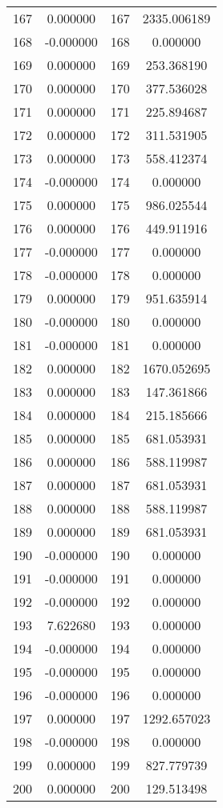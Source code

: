 \documentclass[12pt]{article}
\begin{document}
\begin{longtable}{@{}cccc@{}}
167 & 0.000000 & 167 & 2335.006189 \\
168 & -0.000000 & 168 & 0.000000 \\
169 & 0.000000 & 169 & 253.368190 \\
170 & 0.000000 & 170 & 377.536028 \\
171 & 0.000000 & 171 & 225.894687 \\
172 & 0.000000 & 172 & 311.531905 \\
173 & 0.000000 & 173 & 558.412374 \\
174 & -0.000000 & 174 & 0.000000 \\
175 & 0.000000 & 175 & 986.025544 \\
176 & 0.000000 & 176 & 449.911916 \\
177 & -0.000000 & 177 & 0.000000 \\
178 & -0.000000 & 178 & 0.000000 \\
179 & 0.000000 & 179 & 951.635914 \\
180 & -0.000000 & 180 & 0.000000 \\
181 & -0.000000 & 181 & 0.000000 \\
182 & 0.000000 & 182 & 1670.052695 \\
183 & 0.000000 & 183 & 147.361866 \\
184 & 0.000000 & 184 & 215.185666 \\
185 & 0.000000 & 185 & 681.053931 \\
186 & 0.000000 & 186 & 588.119987 \\
187 & 0.000000 & 187 & 681.053931 \\
188 & 0.000000 & 188 & 588.119987 \\
189 & 0.000000 & 189 & 681.053931 \\
190 & -0.000000 & 190 & 0.000000 \\
191 & -0.000000 & 191 & 0.000000 \\
192 & -0.000000 & 192 & 0.000000 \\
193 & 7.622680 & 193 & 0.000000 \\
194 & -0.000000 & 194 & 0.000000 \\
195 & -0.000000 & 195 & 0.000000 \\
196 & -0.000000 & 196 & 0.000000 \\
197 & 0.000000 & 197 & 1292.657023 \\
198 & -0.000000 & 198 & 0.000000 \\
199 & 0.000000 & 199 & 827.779739 \\
200 & 0.000000 & 200 & 129.513498 \\

\end{longtable}
\end{document}

